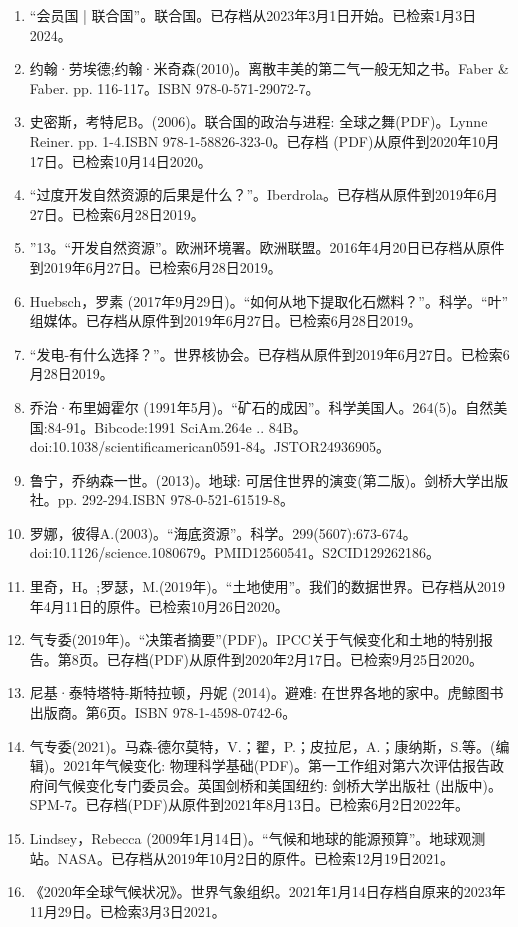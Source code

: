 \begin{enumerate}
\item “会员国 | 联合国”。联合国。已存档从2023年3月1日开始。已检索1月3日2024。
\item 约翰·劳埃德;约翰·米奇森(2010)。离散丰美的第二气一般无知之书。Faber & Faber. pp. 116-117。ISBN 978-0-571-29072-7。
\item 史密斯，考特尼B。(2006)。联合国的政治与进程: 全球之舞(PDF)。Lynne Reiner. pp. 1-4.ISBN  978-1-58826-323-0。已存档 (PDF)从原件到2020年10月17日。已检索10月14日2020。
\item “过度开发自然资源的后果是什么？”。Iberdrola。已存档从原件到2019年6月27日。已检索6月28日2019。
\item ”13。“开发自然资源”。欧洲环境署。欧洲联盟。2016年4月20日已存档从原件到2019年6月27日。已检索6月28日2019。
\item Huebsch，罗素 (2017年9月29日)。“如何从地下提取化石燃料？”。科学。“叶” 组媒体。已存档从原件到2019年6月27日。已检索6月28日2019。
\item “发电-有什么选择？”。世界核协会。已存档从原件到2019年6月27日。已检索6月28日2019。
\item 乔治·布里姆霍尔 (1991年5月)。“矿石的成因”。科学美国人。264(5)。自然美国:84-91。Bibcode:1991 SciAm.264e .. 84B。doi:10.1038/scientificamerican0591-84。JSTOR24936905。 
\item 鲁宁，乔纳森一世。(2013)。地球: 可居住世界的演变(第二版)。剑桥大学出版社。pp. 292-294.ISBN 978-0-521-61519-8。
\item 罗娜，彼得A.(2003)。“海底资源”。科学。299(5607):673-674。doi:10.1126/science.1080679。PMID12560541。S2CID129262186。  
\item 里奇，H。;罗瑟，M.(2019年)。“土地使用”。我们的数据世界。已存档从2019年4月11日的原件。已检索10月26日2020。
\item 气专委(2019年)。“决策者摘要”(PDF)。IPCC关于气候变化和土地的特别报告。第8页。已存档(PDF)从原件到2020年2月17日。已检索9月25日2020。
\item 尼基·泰特塔特-斯特拉顿，丹妮 (2014)。避难: 在世界各地的家中。虎鲸图书出版商。第6页。ISBN 978-1-4598-0742-6。
\item 气专委(2021)。马森-德尔莫特，V.；翟，P.；皮拉尼，A.；康纳斯，S.等。(编辑)。2021年气候变化: 物理科学基础(PDF)。第一工作组对第六次评估报告政府间气候变化专门委员会。英国剑桥和美国纽约: 剑桥大学出版社 (出版中)。SPM-7。已存档(PDF)从原件到2021年8月13日。已检索6月2日2022年。
\item Lindsey，Rebecca (2009年1月14日)。“气候和地球的能源预算”。地球观测站。NASA。已存档从2019年10月2日的原件。已检索12月19日2021。
\item 《2020年全球气候状况》。世界气象组织。2021年1月14日存档自原来的2023年11月29日。已检索3月3日2021。

\end{enumerate}
